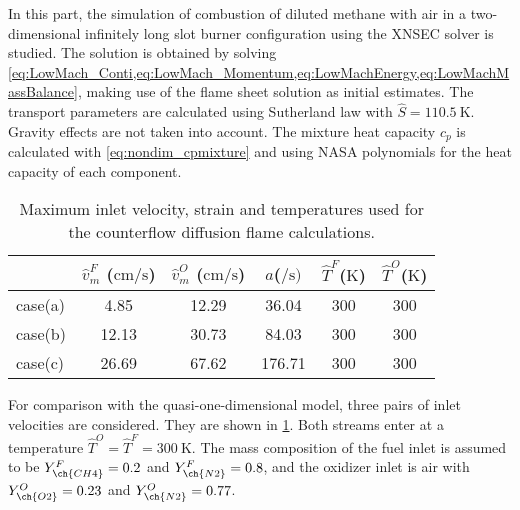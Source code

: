 In this part, the simulation of combustion of diluted methane with air in a two-dimensional infinitely long slot burner configuration using the XNSEC solver is studied. The solution is obtained by solving \cref{eq:LowMach_Conti,eq:LowMach_Momentum,eq:LowMachEnergy,eq:LowMachMassBalance}, making use of the flame sheet solution as initial estimates. The transport parameters are calculated using Sutherland law with $\hat{S} = \SI{110.5}{\kelvin}$. Gravity effects are not taken into account.  The mixture heat capacity $c_p$ is calculated with \cref{eq:nondim_cpmixture} and using NASA polynomials for the heat capacity of each component.
\begin{table}[b]
	\centering
	\begin{tabular}{lccccc}
		\hline
		& \multicolumn{1}{l}{$\hat v^F_m$ ($\si{\centi \meter \per \second}$)} & \multicolumn{1}{l}{$\hat v^O_m$ ($\si{\centi \meter \per \second}$)} & $a$($\si{\per\second})$ & \multicolumn{1}{l}{$\hat T^F$($\si{\kelvin}$)} & \multicolumn{1}{l}{$\hat T^O$($\si{\kelvin}$)} \\ \hline
		case(a) & 4.85                                                                 & 12.29                                                                & 36.04                    & 300                                            & 300                                           \\
		case(b) & 12.13                                                                & 30.73                                                                & 84.03                     & 300                                            & 300                                           \\
		case(c) & 26.69                                                                & 67.62                                                                & 176.71                    & 300                                            & 300                                           \\ \hline
	\end{tabular}
	\caption{Maximum inlet velocity, strain and temperatures used for the counterflow diffusion flame calculations.}
	\label{tab:cdf_velocities}
\end{table}

For comparison with the quasi-one-dimensional model, three pairs of inlet velocities are considered. They are shown in \cref{tab:cdf_velocities}. Both streams enter at a temperature $\hat T^O = \hat T^F = \SI{300}{\kelvin}$. The mass composition of the fuel inlet is assumed to be  $Y^F_{\ch{CH4}} = 0.2$ and $Y^F_{\ch{N2}} = 0.8$, and the oxidizer inlet is air with  $Y^O_{\ch{O2}} = 0.23$ and $Y^O_{\ch{N2}} = 0.77$. 


